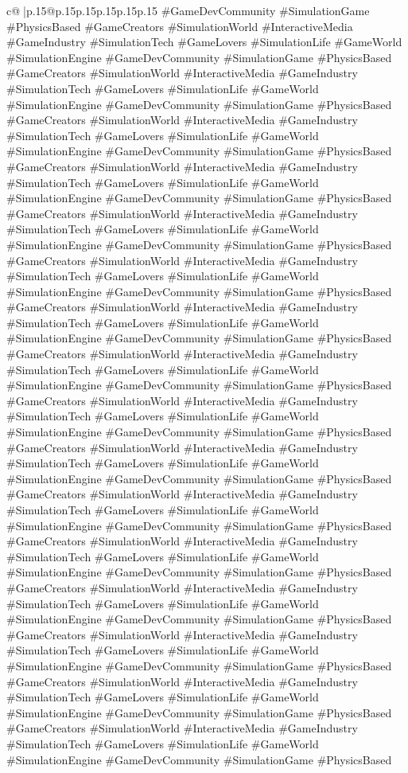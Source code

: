 \documentclass{article}
\begin{document}
{\begin{supertabular}{c@{$\;$}|p{.15\linewidth}@{}p{.15\linewidth}p{.15\linewidth}p{.15\linewidth}p{.15\linewidth}p{.15\linewidth}}
{{{\#GameDevCommunity \#SimulationGame \#PhysicsBased \#GameCreators \#SimulationWorld \#InteractiveMedia \#GameIndustry \#SimulationTech \#GameLovers \#SimulationLife \#GameWorld \#SimulationEngine \#GameDevCommunity \#SimulationGame \#PhysicsBased \#GameCreators \#SimulationWorld \#InteractiveMedia \#GameIndustry \#SimulationTech \#GameLovers \#SimulationLife \#GameWorld \#SimulationEngine \#GameDevCommunity \#SimulationGame \#PhysicsBased \#GameCreators \#SimulationWorld \#InteractiveMedia \#GameIndustry \#SimulationTech \#GameLovers \#SimulationLife \#GameWorld \#SimulationEngine \#GameDevCommunity \#SimulationGame \#PhysicsBased \#GameCreators \#SimulationWorld \#InteractiveMedia \#GameIndustry \#SimulationTech \#GameLovers \#SimulationLife \#GameWorld \#SimulationEngine \#GameDevCommunity \#SimulationGame \#PhysicsBased \#GameCreators \#SimulationWorld \#InteractiveMedia \#GameIndustry \#SimulationTech \#GameLovers \#SimulationLife \#GameWorld \#SimulationEngine \#GameDevCommunity \#SimulationGame \#PhysicsBased \#GameCreators \#SimulationWorld \#InteractiveMedia \#GameIndustry \#SimulationTech \#GameLovers \#SimulationLife \#GameWorld \#SimulationEngine \#GameDevCommunity \#SimulationGame \#PhysicsBased \#GameCreators \#SimulationWorld \#InteractiveMedia \#GameIndustry \#SimulationTech \#GameLovers \#SimulationLife \#GameWorld \#SimulationEngine \#GameDevCommunity \#SimulationGame \#PhysicsBased \#GameCreators \#SimulationWorld \#InteractiveMedia \#GameIndustry \#SimulationTech \#GameLovers \#SimulationLife \#GameWorld \#SimulationEngine \#GameDevCommunity \#SimulationGame \#PhysicsBased \#GameCreators \#SimulationWorld \#InteractiveMedia \#GameIndustry \#SimulationTech \#GameLovers \#SimulationLife \#GameWorld \#SimulationEngine \#GameDevCommunity \#SimulationGame \#PhysicsBased \#GameCreators \#SimulationWorld \#InteractiveMedia \#GameIndustry \#SimulationTech \#GameLovers \#SimulationLife \#GameWorld \#SimulationEngine \#GameDevCommunity \#SimulationGame \#PhysicsBased \#GameCreators \#SimulationWorld \#InteractiveMedia \#GameIndustry \#SimulationTech \#GameLovers \#SimulationLife \#GameWorld \#SimulationEngine \#GameDevCommunity \#SimulationGame \#PhysicsBased \#GameCreators \#SimulationWorld \#InteractiveMedia \#GameIndustry \#SimulationTech \#GameLovers \#SimulationLife \#GameWorld \#SimulationEngine \#GameDevCommunity \#SimulationGame \#PhysicsBased \#GameCreators \#SimulationWorld \#InteractiveMedia \#GameIndustry \#SimulationTech \#GameLovers \#SimulationLife \#GameWorld \#SimulationEngine \#GameDevCommunity \#SimulationGame \#PhysicsBased \#GameCreators \#SimulationWorld \#InteractiveMedia \#GameIndustry \#SimulationTech \#GameLovers \#SimulationLife \#GameWorld \#SimulationEngine \#GameDevCommunity \#SimulationGame \#PhysicsBased \#GameCreators \#SimulationWorld \#InteractiveMedia \#GameIndustry \#SimulationTech \#GameLovers \#SimulationLife \#GameWorld \#SimulationEngine \#GameDevCommunity \#SimulationGame \#PhysicsBased \#GameCreators \#SimulationWorld \#InteractiveMedia \#GameIndustry \#SimulationTech \#GameLovers \#SimulationLife \#GameWorld \#SimulationEngine \#GameDevCommunity \#SimulationGame \#PhysicsBased }}}
\end{supertabular}}
\end{document}
